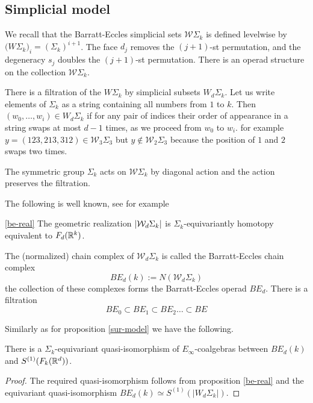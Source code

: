 \subsection{Simplicial model}

We recall that the Barratt-Eccles simplicial sets $\mathcal{W}\Sigma_k$ is defined levelwise by $\mathcal({W}\Sigma_k)_i=(\Sigma_k)^{i+1}$.
The face $d_{j}$ removes the $(j+1)$-st permutation, and the degeneracy $s_j$ doubles the $(j+1)$-st permutation.
There is an operad structure on the collection $\mathcal{W} \Sigma_k$.

There is a filtration of the $W \Sigma_k$ by simplicial subsets
$W_d \Sigma_k$.
Let us write elements of $\Sigma_k$ as a string containing all numbers from $1$ to $k$.
Then $(w_0,\dots,w_i) \in W_d \Sigma_k$ if for any pair of indices their order of appearance in a string swaps at most $d-1$ times, as we proceed from $w_0$ to $w_i$.
for example $y=(123,213,312) \in \mathcal{W}_3 \Sigma_3$ but $y \notin \mathcal{W}_2 \Sigma_3$
because the position of $1$ and $2$ swaps two times.

The symmetric group $\Sigma_k$ acts on
$\mathcal{W} \Sigma_k$ by diagonal action and the action preserves the filtration.

The following is well known, see for example \cite{BF}
\begin{proposition} \ref{be-real}
	The geometric realization $\lvert\mathcal{W}_d \Sigma_k\rvert$ is $\Sigma_k$-equivariantly homotopy equivalent to $F_d(\mathbb{R}^k)$.
\end{proposition}

The (normalized) chain complex of $\mathcal{W}_d\Sigma_k$ is called the Barratt-Eccles chain complex $$BE_d(k):=N(\mathcal{W}_d\Sigma_k)$$
the collection of these complexes forms the Barratt-Eccles operad $BE_d$.
\cite{BF}
There is a filtration
$$BE_0 \subset BE_1 \subset BE_2 \dots \subset BE$$

Similarly as for proposition \ref{sur-model} we have the following.

\begin{proposition}
	There is a  $\Sigma_k$-equivariant quasi-isomorphism
	of $E_\infty$-coalgebras between $BE_d(k)$ and
	$S^{(1)}(F_k(\mathbb{R}^d))$.
\end{proposition}

\begin{proof} \label{be-model}
	The required quasi-isomorphism follows from proposition \ref{be-real} and the equivariant quasi-isomorphism $BE_d(k) \simeq S^{(1)}(|W_d\Sigma_k|)$. %
\end{proof}

